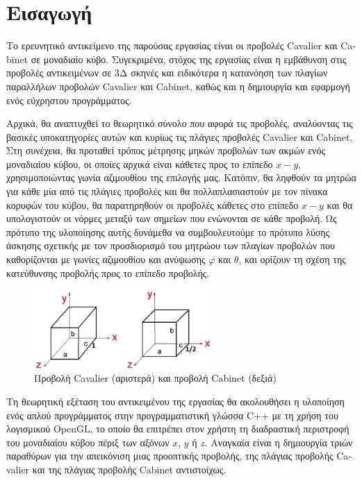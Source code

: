
\chapter*{Εισαγωγή}


Το ερευνητικό αντικείμενο της παρούσας εργασίας είναι οι προβολές \textlatin{Cavalier} και \textlatin{Cabinet} σε μοναδιαίο κύβο. Συγεκριμένα, στόχος της εργασίας είναι η εμβάθυνση στις προβολές αντικειμένων σε 3Δ σκηνές και ειδικότερα η κατανόηση των πλαγίων παραλλήλων προβολών \textlatin{Cavalier} και \textlatin{Cabinet}, καθώς και η δημιουργία και εφαρμογή ενός εύχρηστου προγράμματος. \par

Αρχικά, θα αναπτυχθεί το θεωρητικό σύνολο που αφορά τις προβολές, αναλύοντας τις βασικές υποκατηγορίες αυτών και κυρίως τις πλάγιες προβολές \textlatin{Cavalier} και \textlatin{Cabinet}. Στη συνέχεια, θα προταθεί τρόπος μέτρησης μηκών προβολών των ακμών ενός μοναδιαίου κύβου, οι οποίες αρχικά είναι κάθετες προς το επίπεδο $x-y$, χρησιμοποιώντας γωνία αζιμουθίου της επιλογής μας. Κατόπιν, θα ληφθούν τα μητρώα για κάθε μία από τις πλάγιες προβολές και θα πολλαπλασιαστούν με τον πίνακα κορυφών του κύβου, θα παρατηρηθούν οι προβολές κάθετες στο επίπεδο $x-y$ και θα υπολογιστούν οι νόρμες μεταξύ των σημείων που ενώνονται σε κάθε προβολή. Ως πρότυπο της υλοποίησης αυτής δυνάμεθα να συμβουλευτούμε το πρότυπο λύσης άσκησης σχετικής με τον προσδιορισμό του μητρώου των πλαγίων προβολών που καθορίζονται με γωνίες αζιμουθίου και ανύψωσης $φ$ και $θ$, και ορίζουν τη σχέση της κατεύθυνσης προβολής προς το επίπεδο προβολής. \par

\vspace{0.5em}

\begin{figure}[h]
\centering
\includegraphics[width=0.6\textwidth]{images/Cavalier-Cabinet.jpg}
\caption{Προβολή \textlatin{Cavalier} (αριστερά) και προβολή \textlatin{Cabinet} (δεξιά)}
\end{figure}

Τη θεωρητική εξέταση του αντικειμένου της εργασίας θα ακολουθήσει η υλοποίηση ενός απλού προγράμματος στην προγραμματιστική γλώσσα \textlatin{C++} με τη χρήση του λογισμικού \textlatin{OpenGL}, το οποίο θα επιτρέπει στον χρήστη τη διαδραστική περιστροφή του μοναδιαίου κύβου πέριξ των αξόνων $x$, $y$ ή $z$. Αναγκαία είναι η δημιουργία τριών παραθύρων για την απεικόνιση μιας προοπτικής προβολής, της πλάγιας προβολής \textlatin{Cavalier} και της πλάγιας προβολής \textlatin{Cabinet} αντιστοίχως. \par
